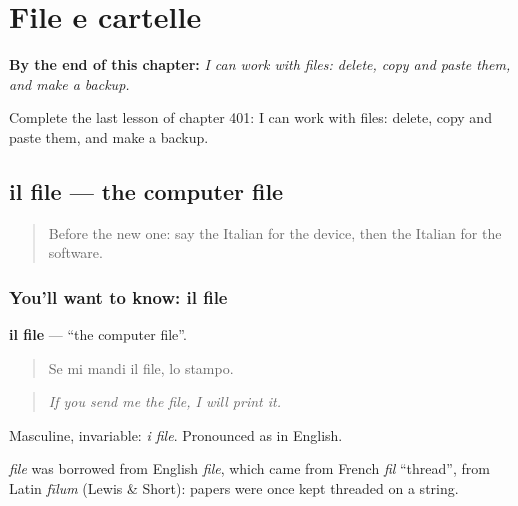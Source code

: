 
\chapter{File e cartelle}
\label{ch:it-file-e-cartelle}

\begin{chapteropening}
\textbf{By the end of this chapter:} \emph{I can work with files: delete, copy and paste them, and make a backup.}

Complete the last lesson of chapter 401: I can work with files: delete, copy and paste them, and make a backup.
\end{chapteropening}

\section[il file]{il file — the computer file}

\label{lesson:IT-C401-file}



\begin{quote}
Before the new one: say the Italian for the device, then the Italian for the software.
\end{quote}

\subsection*{You'll want to know: il file}
\textbf{il file} — \textquotedblleft{}the computer file\textquotedblright{}.

\begin{quote}
Se mi mandi il file, lo stampo.
\end{quote}

\begin{quote}
\emph{If you send me the file, I will print it.}
\end{quote}

Masculine, invariable: \emph{i file}. Pronounced as in English.

\begin{cousinweb}
\emph{file} was borrowed from English \emph{file}, which came from French \emph{fil} \textquotedblleft{}thread\textquotedblright{}, from Latin \emph{fīlum} (Lewis \& Short): papers were once kept threaded on a string.
\end{cousinweb}

